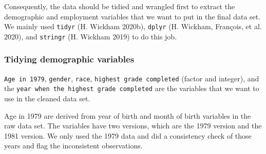 \documentclass{article}
\begin{document}
Consequently, the data should be tidied and wrangled first to extract the demographic and employment variables that we want to put in the final data set. We mainly used \texttt{tidyr} (H. Wickham 2020b), \texttt{dplyr} (H. Wickham, François, et al. 2020), and \texttt{stringr} (H. Wickham 2019) to do this job.

\hypertarget{tidying-demographic-variables}{%
\subsubsection{Tidying demographic variables}\label{tidying-demographic-variables}}

\texttt{Age\ in\ 1979}, \texttt{gender}, \texttt{race}, \texttt{highest\ grade\ completed} (factor and integer), and the \texttt{year\ when\ the\ highest\ grade\ completed} are the variables that we want to use in the cleaned data set.

Age in 1979 are derived from year of birth and month of birth variables in the raw data set. The variables have two versions, which are the 1979 version and the 1981 version. We only used the 1979 data and did a consistency check of those years and flag the inconsistent observations.
\end{document}
